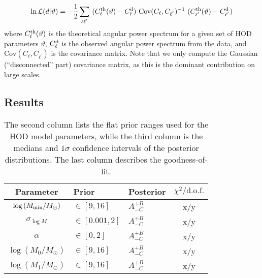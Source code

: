 \begin{align}
    \ln{\mathcal{L}(d|\vartheta)} = -\frac{1}{2} \sum_{\ell\ell^{'}} \ (C_{\ell}^{\rm th}(\vartheta) - C_{\ell}^{\rm d}) \ \text{Cov}(C_{\ell},C_{\ell^{'}})^{-1} \ (C_{\ell^{'}}^{\rm th}(\vartheta) - C_{\ell^{'}}^{\rm d})
\end{align}
where $C_{\ell}^{\rm th}(\vartheta)$ is the theoretical angular power spectrum for a given set of HOD parameters $\vartheta$, $C_{\ell}^{\rm d}$ is the observed angular power spectrum from the data, and $\text{Cov}(C_{\ell},C_{\ell^{'}})$ is the covariance matrix. Note that we only compute the Gaussian (``disconnected'' part) covariance matrix, as this is the dominant contribution on large scales.

\subsection{Results}

\begin{table}
\centering
\begin{tabular}{cllc} 
Parameter & Prior  & Posterior & $\chi^2 / \text{d.o.f.}$\\
\hline
$\log{(M_{\rm min} / M_{\odot})}$ & $\in[9,16]$ & $A^{+B}_{-C}$ & x/y  \\
$\sigma_{\log{M}}$ & $\in[0.001, 2]$ & $A^{+B}_{-C}$ & x/y  \\
$\alpha$ & $ \in[0,2]$ & $A^{+B}_{-C}$ & x/y  \\
$\log{(M_{0} / M_{\odot})}$ & $\in[9,16]$ & $A^{+B}_{-C}$ & x/y  \\
$\log{(M_{1} / M_{\odot})}$ & $\in[9,16]$ & $A^{+B}_{-C}$ & x/y \\
\hline
\end{tabular}
\caption{The second column lists the flat prior ranges used for the HOD model parameters, while the third column is the medians and $1\sigma$ confidence intervals of the posterior distributions. The last column describes the goodness-of-fit.}
\label{tab:hod_mcmc}
\end{table}
